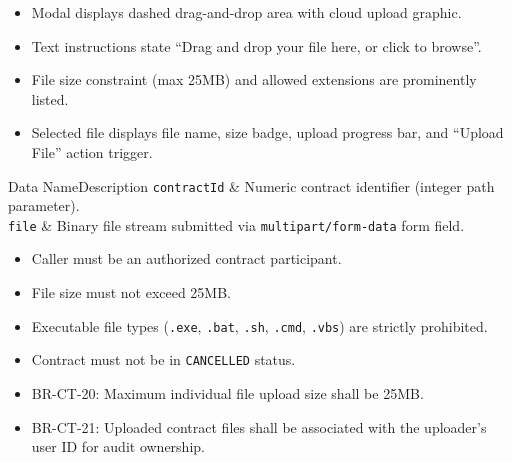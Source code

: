 \begin{itemize}[leftmargin=1.6em,topsep=3pt,itemsep=2pt,parsep=0pt,label=$\bullet$]
      \item Modal displays dashed drag-and-drop area with cloud upload graphic.
      \item Text instructions state ``Drag and drop your file here, or click to browse''.
      \item File size constraint (max 25MB) and allowed extensions are prominently listed.
      \item Selected file displays file name, size badge, upload progress bar, and ``Upload File'' action trigger.
\end{itemize}


\begin{specdatatable}{Data Name}{Description}
      \texttt{contractId} & Numeric contract identifier (integer path parameter).\\ \hline
      \texttt{file} & Binary file stream submitted via \texttt{multipart/form-data} form field.\\ \hline
\end{specdatatable}

\begin{itemize}[leftmargin=1.6em,topsep=3pt,itemsep=2pt,parsep=0pt,label=$\bullet$]
      \item Caller must be an authorized contract participant.
      \item File size must not exceed 25MB.
      \item Executable file types (\texttt{.exe}, \texttt{.bat}, \texttt{.sh}, \texttt{.cmd}, \texttt{.vbs}) are strictly prohibited.
      \item Contract must not be in \texttt{CANCELLED} status.
\end{itemize}

\begin{itemize}[leftmargin=1.6em,topsep=3pt,itemsep=2pt,parsep=0pt,label=$\bullet$]\brrulelist
      \item BR-CT-20: Maximum individual file upload size shall be 25MB.
      \item BR-CT-21: Uploaded contract files shall be associated with the uploader's user ID for audit ownership.
\end{itemize}

